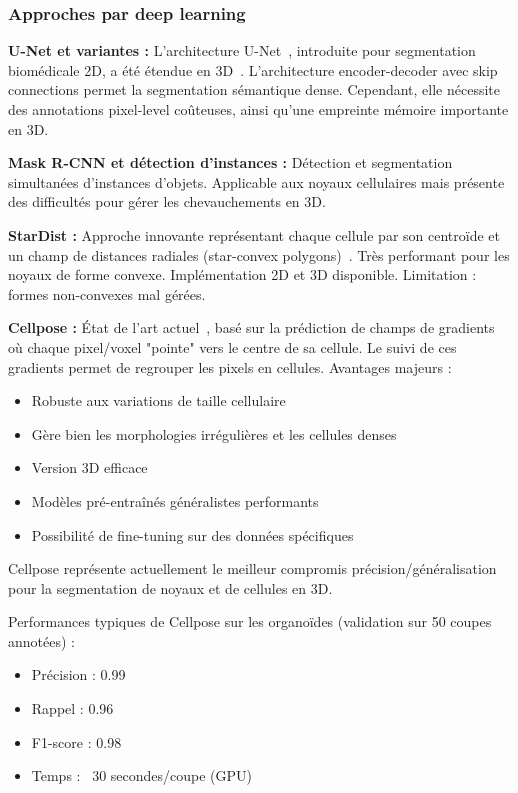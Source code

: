 \subsubsection{Approches par deep learning}

\textbf{U-Net et variantes :}
L'architecture U-Net~\cite{Ronneberger2015}, introduite pour segmentation biomédicale 2D, a été étendue en 3D~\cite{Cicek2016}. L'architecture encoder-decoder avec skip connections permet la segmentation sémantique dense. Cependant, elle nécessite des annotations pixel-level coûteuses, ainsi qu'une empreinte mémoire importante en 3D.

\textbf{Mask R-CNN et détection d'instances :}
Détection et segmentation simultanées d'instances d'objets. Applicable aux noyaux cellulaires mais présente des difficultés pour gérer les chevauchements en 3D.

\textbf{StarDist :}
Approche innovante représentant chaque cellule par son centroïde et un champ de distances radiales (star-convex polygons)~\cite{Schmidt2018}. Très performant pour les noyaux de forme convexe. Implémentation 2D et 3D disponible. Limitation : formes non-convexes mal gérées.

\textbf{Cellpose :}
État de l'art actuel~\cite{Stringer2021}, basé sur la prédiction de champs de gradients où chaque pixel/voxel "pointe" vers le centre de sa cellule. Le suivi de ces gradients permet de regrouper les pixels en cellules. Avantages majeurs :
\begin{itemize}
    \item Robuste aux variations de taille cellulaire
    \item Gère bien les morphologies irrégulières et les cellules denses
    \item Version 3D efficace
    \item Modèles pré-entraînés généralistes performants
    \item Possibilité de fine-tuning sur des données spécifiques
\end{itemize}

Cellpose représente actuellement le meilleur compromis précision/généralisation pour la segmentation de noyaux et de cellules en 3D.

Performances typiques de Cellpose sur les organoïdes (validation sur 50 coupes annotées) :
\begin{itemize}
    \item Précision : 0.99
    \item Rappel : 0.96
    \item F1-score : 0.98
    \item Temps : ~30 secondes/coupe (GPU)
\end{itemize}

